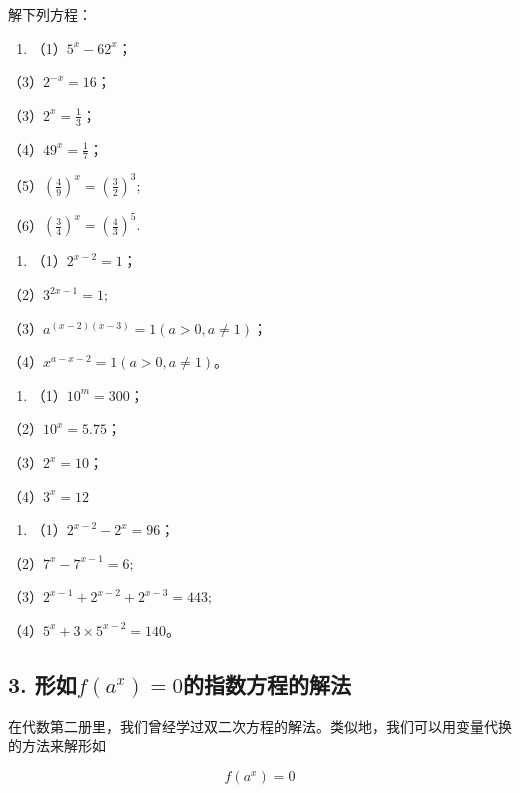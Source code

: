 解下列方程：

\begin{enumerate}
\item
  （1）\(5^{x} - 62^{x}\)；
\end{enumerate}

（3）\(2^{-x} = 16\)；

（3）\(2^{x} = \frac{1}{3}\)；

（4）\(49^{x} = \frac{1}{7}\)；

（5）\(\left(\frac{4}{9}\right)^x = \left(\frac{3}{2}\right)^3;\)

（6）\(\left(\frac{3}{4}\right)^x = \left(\frac{4}{3}\right)^5.\)

\begin{enumerate}[start=2]
\item
  （1）\(2^{x - 2} = 1\)；
\end{enumerate}

（2）\(3^{2x - 1} = 1;\)

（3）\(a^{(x - 2)(x - 3)} = 1\)\((a > 0, a \neq 1)\)；

（4）\(x^{a - x - 2} = 1\)\((a > 0, a \neq 1)\)。

\begin{enumerate}[start=3]
\item
  （1）\(10^{m} = 300\)；
\end{enumerate}

（2）\(10^{x} = 5.75\)；

（3）\(2^{x} = 10\)；

（4）\(3^{x} = 12\)

\begin{enumerate}[start=4]
\item
  （1）\(2^{x - 2} - 2^{x} = 96\)；
\end{enumerate}

（2）\(7^{x} - 7^{x - 1} = 6;\)

（3）\(2^{x - 1} + 2^{x - 2} + 2^{x - 3} = 443;\)

（4）\(5^{x} + 3 \times 5^{x - 2} = 140\)。

\subsection{\texorpdfstring{3. 形如\(f(a^x) = 0\)的指数方程的解法}{3. 形如f(a\^{}x) = 0的指数方程的解法}}

在代数第二册里，我们曾经学过双二次方程的解法。类似地，我们可以用变量代换的方法来解形如

\[
f (a^{x}) = 0
\]

